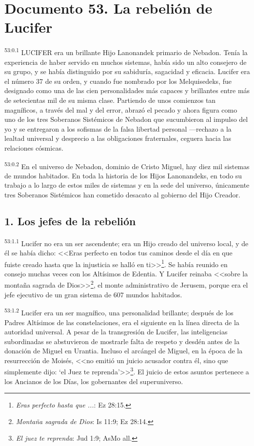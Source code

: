 \chapter{Documento 53. La rebelión de Lucifer}
\par
\textsuperscript{53:0.1} LUCIFER era un brillante Hijo Lanonandek primario de Nebadon. Tenía la experiencia de haber servido en muchos sistemas, había sido un alto consejero de su grupo, y se había distinguido por su sabiduría, sagacidad y eficacia. Lucifer era el número 37 de su orden, y cuando fue nombrado por los Melquisedeks, fue designado como una de las cien personalidades más capaces y brillantes entre más de setecientas mil de su misma clase. Partiendo de unos comienzos tan magníficos, a través del mal y del error, abrazó el pecado y ahora figura como uno de los tres Soberanos Sistémicos de Nebadon que sucumbieron al impulso del yo y se entregaron a los sofismas de la falsa libertad personal ---rechazo a la lealtad universal y desprecio a las obligaciones fraternales, ceguera hacia las relaciones cósmicas.

\par
\textsuperscript{53:0.2} En el universo de Nebadon, dominio de Cristo Miguel, hay diez mil sistemas de mundos habitados. En toda la historia de los Hijos Lanonandeks, en todo su trabajo a lo largo de estos miles de sistemas y en la sede del universo, únicamente tres Soberanos Sistémicos han cometido desacato al gobierno del Hijo Creador.

\section*{1. Los jefes de la rebelión}
\par
\textsuperscript{53:1.1} Lucifer no era un ser ascendente; era un Hijo creado del universo local, y de él se había dicho: <<Eras perfecto en todos tus caminos desde el día en que fuiste creado hasta que la injusticia se halló en ti>>\footnote{\textit{Eras perfecto hasta que ...}: Ez 28:15.}. Se había reunido en consejo muchas veces con los Altísimos de Edentia. Y Lucifer reinaba <<sobre la montaña sagrada de Dios>>\footnote{\textit{Montaña sagrada de Dios}: Is 11:9; Ez 28:14.}, el monte administrativo de Jerusem, porque era el jefe ejecutivo de un gran sistema de 607 mundos habitados.

\par
\textsuperscript{53:1.2} Lucifer era un ser magnífico, una personalidad brillante; después de los Padres Altísimos de las constelaciones, era el siguiente en la línea directa de la autoridad universal. A pesar de la transgresión de Lucifer, las inteligencias subordinadas se abstuvieron de mostrarle falta de respeto y desdén antes de la donación de Miguel en Urantia. Incluso el arcángel de Miguel, en la época de la resurrección de Moisés, <<no emitió un juicio acusador contra él, sino que simplemente dijo: `el Juez te reprenda'>>\footnote{\textit{El juez te reprenda}: Jud 1:9; AsMo all.}. El juicio de estos asuntos pertenece a los Ancianos de los Días, los gobernantes del superuniverso.

